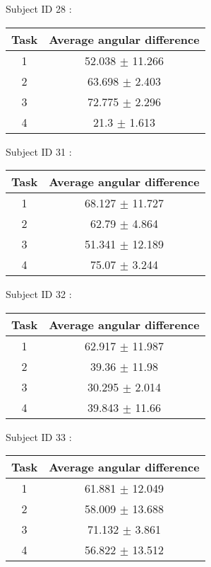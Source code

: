 \documentclass[12pt]{article}
\begin{document}
\par Subject ID  28 :
\begin{center}
\begin{tabular}{|c|c|}
\hline
 Task & Average angular difference \\ \hline
1  &  52.038 $\pm$ 11.266 \\
2  &  63.698 $\pm$ 2.403 \\
3  &  72.775 $\pm$ 2.296 \\
4  &  21.3 $\pm$ 1.613 \\
\hline
\end{tabular}
\end{center}

\par Subject ID  31 :
\begin{center}
\begin{tabular}{|c|c|}
\hline
 Task & Average angular difference \\ \hline
1  &  68.127 $\pm$ 11.727 \\
2  &  62.79 $\pm$ 4.864 \\
3  &  51.341 $\pm$ 12.189 \\
4  &  75.07 $\pm$ 3.244 \\
\hline
\end{tabular}
\end{center}

\par Subject ID  32 :
\begin{center}
\begin{tabular}{|c|c|}
\hline
 Task & Average angular difference \\ \hline
1  &  62.917 $\pm$ 11.987 \\
2  &  39.36 $\pm$ 11.98 \\
3  &  30.295 $\pm$ 2.014 \\
4  &  39.843 $\pm$ 11.66 \\
\hline
\end{tabular}
\end{center}

\par Subject ID  33 :
\begin{center}
\begin{tabular}{|c|c|}
\hline
 Task & Average angular difference \\ \hline
1  &  61.881 $\pm$ 12.049 \\
2  &  58.009 $\pm$ 13.688 \\
3  &  71.132 $\pm$ 3.861 \\
4  &  56.822 $\pm$ 13.512 \\
\hline
\end{tabular}
\end{center}
\end{document}
